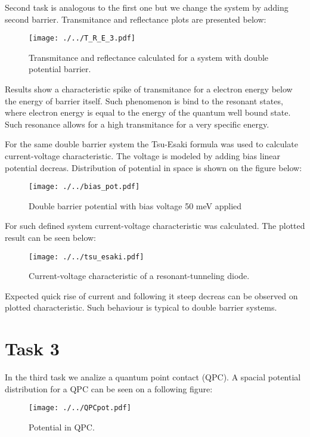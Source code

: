 \documentclass[a4paper,12pt]{article}
\begin{document}
	Second task is analogous to the first one but we change the system by adding second barrier.
	Transmitance and reflectance plots are presented below:
	
	\begin{figure}[H]
		\centering
		\texttt{[image: ./../T\_R\_E\_3.pdf]}
		\caption{Transmitance and reflectance calculated for a system with double potential barrier.}
	\end{figure}

	Results show a characteristic spike of transmitance for a electron energy below the energy of barrier itself. Such phenomenon is bind to the resonant states, where electron energy is equal to the energy of the quantum well bound state. Such resonance allows for a high transmitance for a very specific energy.
	
	For the same double barrier system the Tsu-Esaki formula was used to calculate current-voltage characteristic. The voltage is modeled by adding bias linear potential decreas. Distribution of potential in space is shown on the figure below:
	
	\begin{figure}[H]
		\centering
		\texttt{[image: ./../bias\_pot.pdf]}
		\caption{Double barrier potential with bias voltage 50 meV applied}
	\end{figure}
	
	For such defined system current-voltage characteristic was calculated. The plotted result can be seen below:
	
	\begin{figure}[H]
		\centering\texttt{[image: ./../tsu\_esaki.pdf]}
		\caption{Current-voltage characteristic of a resonant-tunneling diode.}
	\end{figure}

	Expected quick rise of current and following it steep decreas can be observed on plotted characteristic. Such behaviour is typical to double barrier systems.
	
	\section*{Task 3}
	
	In the third task we analize a quantum point contact (QPC). A spacial potential distribution for a QPC can be seen on a following figure:
	
	\begin{figure}[H]
		\centering
		\texttt{[image: ./../QPCpot.pdf]}
		\caption{Potential in QPC.}
	\end{figure}
\end{document}
